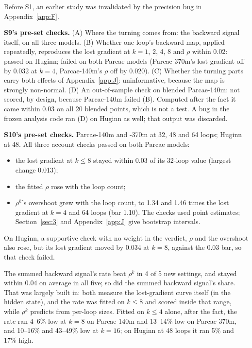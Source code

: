 \documentclass[10pt]{article}
\begin{document}
Before S1, an earlier study was invalidated by the precision bug in Appendix~\ref{app:F}.

\textbf{S9's pre-set checks.} (A) Where the turning comes from: the backward signal itself, on all three models. (B) Whether one loop's backward map, applied repeatedly, reproduces the lost gradient at $k = 1$, 2, 4, 8 and $\rho$ within 0.02: passed on Huginn; failed on both Parcae models (Parcae-370m's lost gradient off by 0.032 at $k = 4$, Parcae-140m's $\rho$ off by 0.020). (C) Whether the turning parts carry both effects of Appendix~\ref{app:J}: uninformative, because the map is strongly non-normal. (D) An out-of-sample check on blended Parcae-140m: not scored, by design, because Parcae-140m failed (B). Computed after the fact it came within 0.03 on all 20 blended points, which is not a test. A bug in the frozen analysis code ran (D) on Huginn as well; that output was discarded.

\textbf{S10's pre-set checks.} Parcae-140m and -370m at 32, 48 and 64 loops; Huginn at 48. All three account checks passed on both Parcae models:

\begin{itemize}
\item the lost gradient at $k \leq  8$ stayed within 0.03 of its 32-loop value (largest change 0.013);
\item the fitted $\rho$ rose with the loop count;
\item $\rho^{k}$'s overshoot grew with the loop count, to 1.34 and 1.46 times the lost gradient at $k = 4$ and 64 loops (bar 1.10). The checks used point estimates; Section~\ref{sec:3} and Appendix~\ref{app:J} give bootstrap intervals.
\end{itemize}

On Huginn, a supportive check with no weight in the verdict, $\rho$ and the overshoot also rose, but its lost gradient moved by 0.034 at $k = 8$, against the 0.03 bar, so that check failed.

The summed backward signal's rate beat $\rho^{k}$ in 4 of 5 new settings, and stayed within 0.04 on average in all five; so did the summed backward signal's share. That was largely built in: both measure the lost-gradient curve itself (in the hidden state), and the rate was fitted on $k \leq  8$ and scored inside that range, while $\rho^{k}$ predicts from per-loop sizes. Fitted on $k \leq  4$ alone, after the fact, the rate ran 4--6\% low at $k = 8$ on Parcae-140m and 13--14\% low on Parcae-370m, and 10--16\% and 43--49\% low at $k = 16$; on Huginn at 48 loops it ran 5\% and 17\% high.
\end{document}
